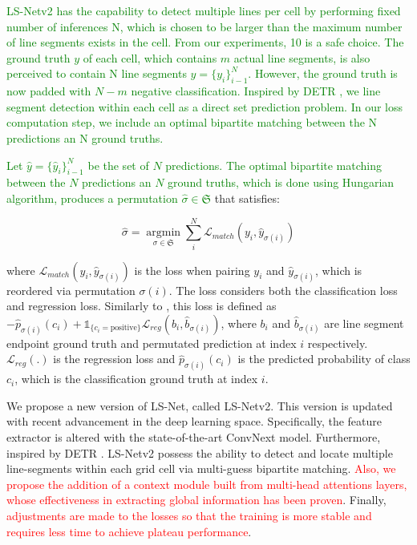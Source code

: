 \documentclass[journal]{IEEEtran}
\begin{document}
\textcolor{green}{LS-Netv2 has the capability to detect multiple lines per cell by performing fixed number of inferences N, which is chosen to be larger than the maximum number of line segments exists in the cell. From our experiments, 10 is a safe choice. The ground truth $y$ of each cell, which contains $m$ actual line segments, is also perceived to contain N line segments $y=\{y_i\}^N_{i-1}$. However, the ground truth is now padded with $N-m$ negative classification. Inspired by DETR \cite{DETR}, we line segment detection within each cell as a direct set prediction problem. In our loss computation step, we include an optimal bipartite matching between the N predictions an N ground truths.}

\textcolor{green}{Let $\hat{y}=\{\hat{y}_i\}^N_{i-1}$ be the set of $N$ predictions. The optimal bipartite matching between the $N$ predictions an $N$ ground truths, which is done using Hungarian algorithm, produces a permutation $\hat{\sigma} \in \mathfrak{S}$} that satisfies:

\begin{equation} \label{bipartite_eqn}
\hat{\sigma} = \mathop{\arg \min}\limits_{\sigma \in \mathfrak{S}} \sum_i^N \mathcal{L}_{match} (y_i, \hat{y}_{\sigma(i)})
\end{equation}

where $\mathcal{L}_{match} (y_i, \hat{y}_{\sigma(i)})$ is the loss when pairing $y_i$ and $\hat{y}_{\sigma(i)}$, which is reordered via permutation $\sigma(i)$. The loss considers both the classification loss and regression loss. Similarly to \cite{DETR}, this loss is defined as $-\hat{p}_{\sigma(i)}(c_i) + \mathds{1}_{\{c_i=\text{positive}\}}\mathcal{L}_{reg}(b_i, \hat{b}_{\sigma(i)})$, where $b_i$ and $\hat{b}_{\sigma(i)}$ are line segment endpoint ground truth and permutated prediction at index $i$ respectively. $\mathcal{L}_{reg}(.)$ is the regression loss and $\hat{p}_{\sigma(i)}(c_i)$ is the predicted probability of class $c_i$, which is the classification ground truth at index $i$.


We propose a new version of LS-Net, called LS-Netv2. This version is updated with recent advancement in the deep learning space. Specifically, the feature extractor is altered with the state-of-the-art ConvNext model. Furthermore, inspired by DETR \cite{DETR}. LS-Netv2 possess the ability to detect and locate multiple line-segments within each grid cell via multi-guess bipartite matching.  \textcolor{red}{Also, we propose the addition of a context module built from multi-head attentions layers, whose effectiveness in extracting global information has been proven}. Finally, \textcolor{red}{adjustments are made to the losses so that the training is more stable and requires less time to achieve plateau performance}.
\end{document}
